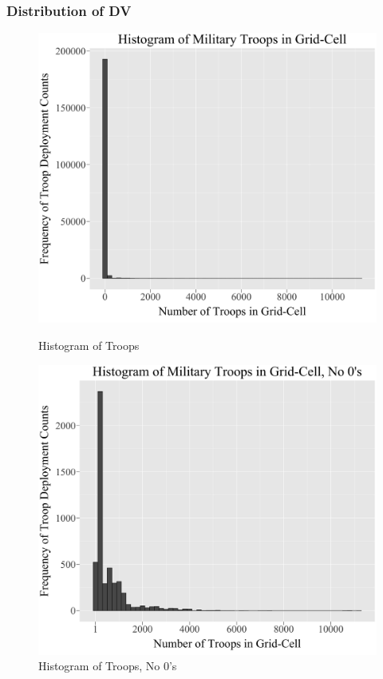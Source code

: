 \documentclass{beamer}
\begin{document}
\begin{frame}
\frametitle{Distribution of DV}

\begin{figure}
\centering
\begin{minipage}{.5\textwidth}
  \centering
  \includegraphics[width=.90\linewidth]{gg_Hist_DV.jpg}
  \caption{Histogram of Troops}
  \label{fig:test1}
\end{minipage}%
\begin{minipage}{.5\textwidth}
  \centering
  \includegraphics[width=.90\linewidth]{gg_Hist_DV_No_0.jpg}
  \caption{Histogram of Troops, No 0's}
  \label{fig:test2}
\end{minipage}
\end{figure}

\end{frame}
\end{document}
